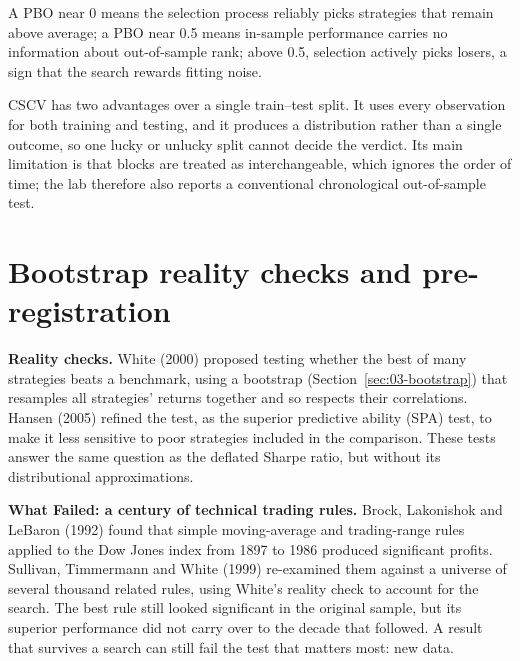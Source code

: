 
A PBO near 0 means the selection process reliably picks strategies that remain above average; a PBO near 0.5 means in-sample performance carries no information about out-of-sample rank; above 0.5, selection actively picks losers, a sign that the search rewards fitting noise.

CSCV has two advantages over a single train--test split. It uses every observation for both training and testing, and it produces a distribution rather than a single outcome, so one lucky or unlucky split cannot decide the verdict. Its main limitation is that blocks are treated as interchangeable, which ignores the order of time; the lab therefore also reports a conventional chronological out-of-sample test.

\section{Bootstrap reality checks and pre-registration}
\label{sec:04-reality}

\textbf{Reality checks.} White (2000) proposed testing whether the best of many strategies beats a benchmark, using a bootstrap (Section~\ref{sec:03-bootstrap}) that resamples all strategies' returns together and so respects their correlations. Hansen (2005) refined the test, as the superior predictive ability (SPA) test, to make it less sensitive to poor strategies included in the comparison. These tests answer the same question as the deflated Sharpe ratio, but without its distributional approximations.

\begin{callout}
\textbf{What Failed: a century of technical trading rules.} Brock, Lakonishok and LeBaron (1992) found that simple moving-average and trading-range rules applied to the Dow Jones index from 1897 to 1986 produced significant profits. Sullivan, Timmermann and White (1999) re-examined them against a universe of several thousand related rules, using White's reality check to account for the search. The best rule still looked significant in the original sample, but its superior performance did not carry over to the decade that followed. A result that survives a search can still fail the test that matters most: new data.
\end{callout}

